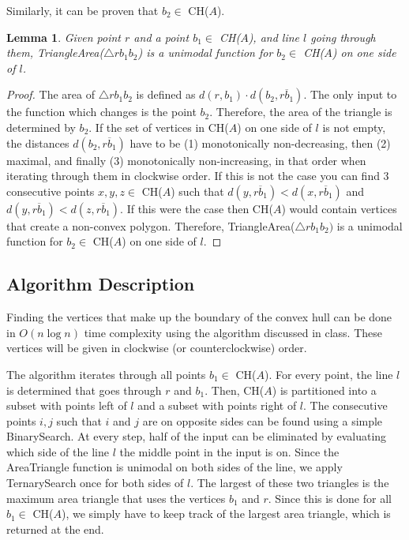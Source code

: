 \documentclass{article}
\newtheorem{lemma}[theorem] {Lemma}
\begin{document}
  Similarly, it can be proven that $b_2 \in$ CH($A$).

  \vspace{0.5cm}
  \begin{lemma}
      Given point $r$ and a point $b_1 \in$ CH($A$), and line $l$ going through them, 
      TriangleArea($\triangle rb_1b_2$) is a unimodal function for $b_2 \in$ CH($A$) on one side of $l$.
  \end{lemma}

  \begin{proof}
      The area of $\triangle rb_1b_2$ is defined as $d(r, b_1) \cdot d(b_2, \overline{rb_1})$. The only input to the function which changes is the point $b_2$. Therefore, the area of the triangle is determined by $b_2$.
      If the set of vertices in CH($A$) on one side of $l$ is not empty, the distances $d(b_2, \overline{rb_1})$ have to be (1) monotonically non-decreasing, then (2) maximal, and finally (3) monotonically non-increasing, in that order when iterating through them in clockwise order.
      If this is not the case you can find 3 consecutive points $x, y, z \in$ CH($A$) such that $d(y, \overline{rb_1}) < d(x, \overline{rb_1})$ and $d(y, \overline{rb_1}) < d(z, \overline{rb_1})$.
      If this were the case then CH($A$) would contain vertices that create a non-convex polygon. 
      Therefore, TriangleArea($\triangle rb_1b_2)$ is a unimodal function for $b_2 \in$ CH($A$) on one side of $l$.
  \end{proof}

  \subsection*{Algorithm Description}
  Finding the vertices that make up the boundary of the convex hull can be done in $O(n\log n)$ time complexity using the algorithm discussed in class.
  These vertices will be given in clockwise (or counterclockwise) order. 
  
  The algorithm iterates through all points $b_1 \in$ CH($A$). For every point, the line $l$ is determined that goes through $r$ and $b_1$.
  Then, CH($A$) is partitioned into a subset with points left of $l$ and a subset with points right of $l$. 
  The consecutive points $i, j$ such that $i$ and $j$ are on opposite sides can be found using a simple BinarySearch. 
  At every step, half of the input can be eliminated by evaluating which side of the line $l$ the middle point in the input is on. 
  Since the AreaTriangle function is unimodal on both sides of the line, we apply TernarySearch once for both sides of $l$.
  The largest of these two triangles is the maximum area triangle that uses the vertices $b_1$ and $r$. 
  Since this is done for all $b_1 \in$ CH($A$), we simply have to keep track of the largest area triangle, which is returned at the end. \\
\end{document}
